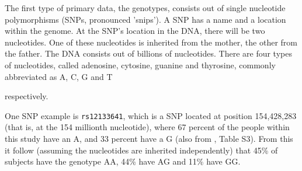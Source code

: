 The first type of primary data, the genotypes, 
consists out of single nucleotide polymorphisms (SNPs, pronounced 'snips').
A SNP has a name and a location within the genome.
At the SNP's location in the DNA, there will be two nucleotides.
One of these nucleotides is inherited from the mother, 
the other from the father.
The DNA consists out of billions of nucleotides.
There are four types of nucleotides,
called adenosine, cytosine, guanine and thyrosine, 
commonly abbreviated as A, C, G and T 

respectively.


One SNP example is \verb|rs12133641|, which is a SNP located at position 
154,428,283 (that is, at the 154 millionth nucleotide), 
where 67 percent of the people within this study have an A,
and 33 percent have a G (also from \cite{ahsan2017relative}, Table S3).
From this it follow (assuming the nucleotides are inherited independently)
that 45\% of subjects have the genotype AA, 44\% have AG and 11\% have GG.

